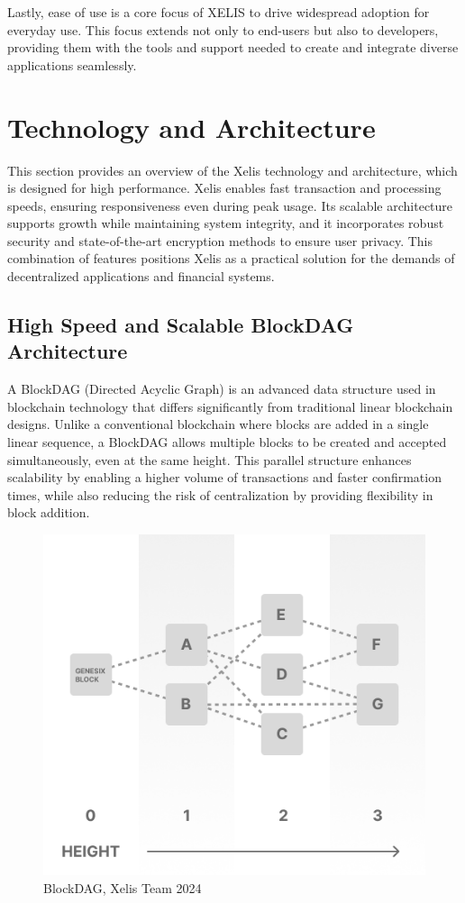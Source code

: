 \documentclass[12pt,a4paper,twocolumn]{article}
\begin{document}
Lastly, ease of use is a core focus of XELIS to drive widespread adoption for everyday use. This focus extends not only to end-users but also to developers, providing them with the tools and support needed to create and integrate diverse applications seamlessly.\\

\section{Technology and Architecture}

This section provides an overview of the Xelis technology and architecture, which is designed for high performance. Xelis enables fast transaction and processing speeds, ensuring responsiveness even during peak usage. Its scalable architecture supports growth while maintaining system integrity, and it incorporates robust security and state-of-the-art encryption methods to ensure user privacy. This combination of features positions Xelis as a practical solution for the demands of decentralized applications and financial systems.\\

\subsection{High Speed and Scalable BlockDAG Architecture}

A BlockDAG (Directed Acyclic Graph) is an advanced data structure used in blockchain technology that differs significantly from traditional linear blockchain designs. Unlike a conventional blockchain where blocks are added in a single linear sequence, a BlockDAG allows multiple blocks to be created and accepted simultaneously, even at the same height. This parallel structure enhances scalability by enabling a higher volume of transactions and faster confirmation times, while also reducing the risk of centralization by providing flexibility in block addition.\\

\begin{figure}
    \centering
    \includegraphics[width=0.8\linewidth]{Frame 1 (7).png}
    \caption{BlockDAG, Xelis Team 2024}
\end{figure}
\end{document}
